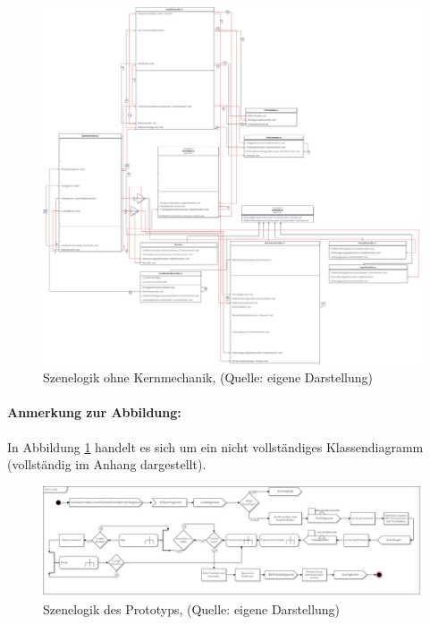 \begin{figure}[ht]
\centering
\includegraphics[width=1\linewidth]{content/pictures/Level_loop_upto_character_creation.jpg}
\caption{Szenelogik ohne Kernmechanik, (Quelle: eigene Darstellung)}
\label{fig:level_game_loop_class_connectors}
\end{figure}

\paragraph{Anmerkung zur Abbildung:}
In Abbildung \ref{fig:level_game_loop_class_connectors} handelt es sich um ein nicht vollständiges Klassendiagramm (vollständig im Anhang dargestellt).

\begin{figure}[ht]
\centering
\includegraphics[width=1\linewidth]{content/pictures/level-loop_prototype.jpg}
\caption{Szenelogik des Prototyps, (Quelle: eigene Darstellung)}
\label{fig:level_loop_prototype}
\end{figure}

